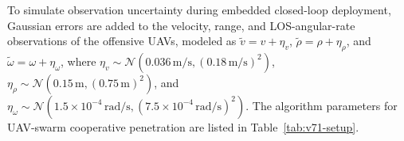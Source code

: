 \documentclass{cja}
\begin{document}
To simulate observation uncertainty during embedded closed-loop deployment, Gaussian errors are added to the velocity, range, and LOS-angular-rate observations of the offensive UAVs, modeled as $\tilde v=v+\eta_v$, $\tilde\rho=\rho+\eta_\rho$, and $\tilde\omega=\omega+\eta_\omega$, where $\eta_v\sim\mathcal{N}\!\left(0.036\,\mathrm{m/s},(0.18\,\mathrm{m/s})^2\right)$, $\eta_\rho\sim\mathcal{N}\!\left(0.15\,\mathrm{m},(0.75\,\mathrm{m})^2\right)$, and $\eta_\omega\sim\mathcal{N}\!\left(1.5\times10^{-4}\,\mathrm{rad/s},(7.5\times10^{-4}\,\mathrm{rad/s})^2\right)$.
The algorithm parameters for UAV-swarm cooperative penetration are listed in Table~\ref{tab:v71-setup}.

\begin{table}[!t]
\centering
\scriptsize
\setlength{\tabcolsep}{3.2pt}
\renewcommand{\arraystretch}{1.1}
\caption{Simulation parameter settings}
\label{tab:v71-setup}
\end{table}
\end{document}
